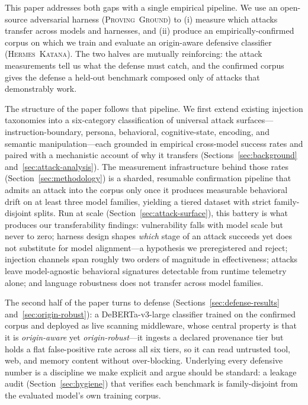 \documentclass{article}
\newcommand{\dataset}{\textsc{Proving~Ground}}
\newcommand{\katana}{\textsc{Hermes~Katana}}
\begin{document}
This paper addresses both gaps with a single empirical pipeline. We use an open-source adversarial harness (\dataset) to (i) measure which attacks transfer across models and harnesses, and (ii) produce an empirically-confirmed corpus on which we train and evaluate an origin-aware defensive classifier (\katana). The two halves are mutually reinforcing: the attack measurements tell us what the defense must catch, and the confirmed corpus gives the defense a held-out benchmark composed only of attacks that demonstrably work.

The structure of the paper follows that pipeline. We first extend existing injection taxonomies into a six-category classification of universal attack surfaces---instruction-boundary, persona, behavioral, cognitive-state, encoding, and semantic manipulation---each grounded in empirical cross-model success rates and paired with a mechanistic account of why it transfers (Sections~\ref{sec:background} and~\ref{sec:attack-analysis}). The measurement infrastructure behind those rates (Section~\ref{sec:methodology}) is a sharded, resumable confirmation pipeline that admits an attack into the corpus only once it produces measurable behavioral drift on at least three model families, yielding a tiered dataset with strict family-disjoint splits. Run at scale (Section~\ref{sec:attack-surface}), this battery is what produces our transferability findings: vulnerability falls with model scale but never to zero; harness design shapes \emph{which} stage of an attack succeeds yet does not substitute for model alignment---a hypothesis we preregistered and reject; injection channels span roughly two orders of magnitude in effectiveness; attacks leave model-agnostic behavioral signatures detectable from runtime telemetry alone; and language robustness does not transfer across model families.

The second half of the paper turns to defense (Sections~\ref{sec:defense-results} and~\ref{sec:origin-robust}): a DeBERTa-v3-large classifier trained on the confirmed corpus and deployed as live scanning middleware, whose central property is that it is \emph{origin-aware} yet \emph{origin-robust}---it ingests a declared provenance tier but holds a flat false-positive rate across all six tiers, so it can read untrusted tool, web, and memory content without over-blocking. Underlying every defensive number is a discipline we make explicit and argue should be standard: a leakage audit (Section~\ref{sec:hygiene}) that verifies each benchmark is family-disjoint from the evaluated model's own training corpus.
\end{document}
